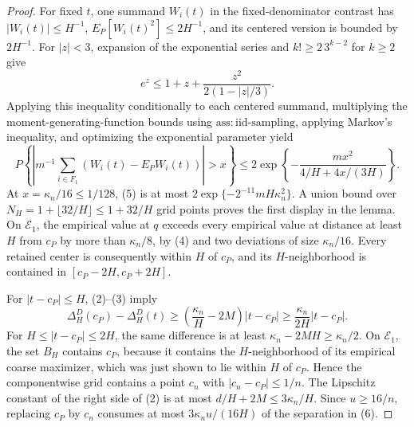\documentclass{article}
\begin{document}
\begin{proof}
For fixed \(t\), one summand \(W_i(t)\) in the fixed-denominator
contrast has \(|W_i(t)|\le H^{-1}\),
\(E_P[W_i(t)^2]\le2H^{-1}\), and its centered version is bounded by
\(2H^{-1}\).  For \(|z|<3\), expansion of the exponential series and
\(k!\ge2\,3^{k-2}\) for \(k\ge2\) give
\[
 e^z\le1+z+\frac{z^2}{2(1-|z|/3)}.
\]
Applying this inequality conditionally to each centered summand,
multiplying the moment-generating-function bounds using
\(\mathrm{ass:iid\mbox{-}sampling}\), applying Markov's inequality,
and optimizing the exponential parameter yield
\[
 P\left\{\left|m^{-1}\sum_{i\in F_1}
       (W_i(t)-E_PW_i(t))\right|>x\right\}
 \le2\exp\left\{-\frac{mx^2}{4/H+4x/(3H)}\right\}. \tag{5}
\]
At \(x=\kappa_n/16\le1/128\), (5) is at most
\(2\exp\{-2^{-11}mH\kappa_n^2\}\).  A union bound over
\(N_H=1+\lfloor32/H\rfloor\le1+32/H\) grid points proves the first
display in the lemma.  On \(\mathcal E_1\), the empirical value at
\(q\) exceeds every empirical value at distance at least \(H\) from
\(c_P\) by more than \(\kappa_n/8\), by (4) and two deviations of
size \(\kappa_n/16\).  Every retained center is consequently within
\(H\) of \(c_P\), and its \(H\)-neighborhood is contained in
\([c_P-2H,c_P+2H]\).

For \(|t-c_P|\le H\), (2)--(3) imply
\[
 \Delta_H^D(c_P)-\Delta_H^D(t)
 \ge\left(\frac{\kappa_n}{H}-2M\right)|t-c_P|
 \ge\frac{\kappa_n}{2H}|t-c_P|. \tag{6}
\]
For \(H\le|t-c_P|\le2H\), the same difference is at least
\(\kappa_n-2MH\ge\kappa_n/2\).  On \(\mathcal E_1\), the set
\(B_H\) contains \(c_P\), because it contains the \(H\)-neighborhood
of its empirical coarse maximizer, which was just shown to lie within
\(H\) of \(c_P\).  Hence the componentwise grid contains a point
\(c_n\) with \(|c_n-c_P|\le1/n\).  The Lipschitz constant of the
right side of (2) is at most
\(d/H+2M\le3\kappa_n/H\).  Since \(u\ge16/n\), replacing \(c_P\)
by \(c_n\) consumes at most \(3\kappa_nu/(16H)\) of the separation
in (6).


\end{proof}
\end{document}
